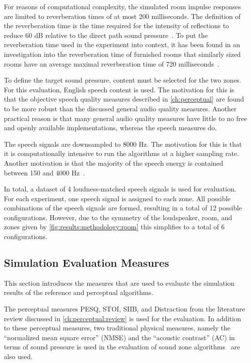For reasons of computational complexity, the simulated room impulse responses are limited to reverberation times of at most 200 milliseconds.
The definition of the reverberation time is the time required for the intensity of reflections to reduce 60 dB relative to the direct path sound pressure~\cite{habets2006room}. 
To put the reverberation time used in the experiment into context, 
it has been found in an investigation into the reverberation time of furnished rooms
that similarly sized rooms have an average maximal reverberation 
time of 720 milliseconds~\cite{diaz2005reverberation}.

To define the target sound pressure, content must be selected for the two zones.
For this evaluation, English speech content is used.
The motivation for this is that the objective speech quality measures described in 
\autoref{ch:perceptual} are found to be more robust than
the discussed general audio quality measures.
Another practical reason is that many general audio quality measures have 
little to no free and openly available implementations, whereas the speech measures do.

The speech signals are downsampled to 8000 Hz.
The motivation for this is that it is computationally intensive to run the algorithms at a higher sampling rate.
Another motivation is that the majority of the speech energy is contained between 150 and 4000 Hz~\cite{etsi2010}.

In total, a dataset of 4 loudness-matched speech signals is used for evaluation.
For each experiment, one speech signal is assigned to each zone.
All possible combinations of the speech signals are formed, resulting in a total of 12 possible configurations.
However, due to the symmetry of the loudspeaker, room, and zones given by \autoref{fig:results:methodology:room} this simplifies to a total of 6 configurations.

\subsection{Simulation Evaluation Measures}
\label{ch:results:methodology:measures}
This section introduces the measures that are used to evaluate the simulation results 
of the reference and perceptual algorithms.

The perceptual measures PESQ, STOI, SIIB, and Distraction 
from the literature review discussed in \autoref{ch:perceptual:review} is used for the evaluation.
In addition to these perceptual measures, two traditional physical measures, namely the ``normalized mean square error'' (NMSE) and
the ``acoustic contrast'' (AC) in terms of sound pressure is used in the evaluation of 
sound zone algorithms~\cite{lee2018unified} are also used.

